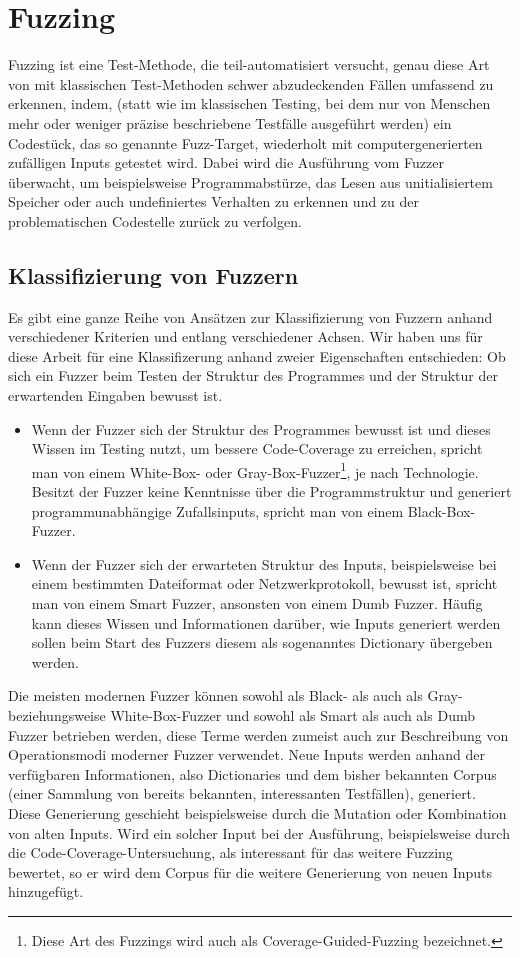 \documentclass[a4paper]{article}
\begin{document}
\section{Fuzzing}
Fuzzing ist eine Test-Methode, die teil-automatisiert versucht, genau diese Art von mit klassischen Test-Methoden schwer abzudeckenden Fällen umfassend zu erkennen, indem, (statt wie im klassischen Testing, bei dem nur von Menschen mehr oder weniger präzise beschriebene Testfälle ausgeführt werden) ein Codestück, das so genannte Fuzz-Target, wiederholt mit computergenerierten zufälligen Inputs getestet wird. 
Dabei wird die Ausführung vom Fuzzer überwacht, um beispielsweise Programmabstürze, das Lesen aus unitialisiertem Speicher oder auch undefiniertes Verhalten zu erkennen und zu der problematischen Codestelle zurück zu verfolgen.

\subsection{Klassifizierung von Fuzzern}
Es gibt eine ganze Reihe von Ansätzen zur Klassifizierung von Fuzzern anhand verschiedener Kriterien und entlang verschiedener Achsen. Wir haben uns für diese Arbeit für eine Klassifizerung anhand zweier Eigenschaften entschieden: Ob sich ein Fuzzer beim Testen der Struktur des Programmes und der Struktur der erwartenden Eingaben bewusst ist.
\begin{itemize}
    \item Wenn der Fuzzer sich der Struktur des Programmes bewusst ist und dieses Wissen im Testing nutzt, um bessere Code-Coverage zu erreichen, spricht man von einem White-Box- oder Gray-Box-Fuzzer\footnote{Diese Art des Fuzzings wird auch als Coverage-Guided-Fuzzing bezeichnet.}, je nach Technologie.
        Besitzt der Fuzzer keine Kenntnisse über die Programmstruktur und generiert programmunabhängige Zufallsinputs, spricht man von einem Black-Box-Fuzzer.
    \item Wenn der Fuzzer sich der erwarteten Struktur des Inputs, beispielsweise bei einem bestimmten Dateiformat oder Netzwerkprotokoll, bewusst ist, spricht man von einem Smart Fuzzer, ansonsten von einem Dumb Fuzzer. Häufig kann dieses Wissen und Informationen darüber, wie Inputs generiert werden sollen beim Start des Fuzzers diesem als sogenanntes Dictionary übergeben werden.
\end{itemize}
Die meisten modernen Fuzzer können sowohl als Black- als auch als Gray- beziehungsweise White-Box-Fuzzer und sowohl als Smart als auch als Dumb Fuzzer betrieben werden, diese Terme werden zumeist auch zur Beschreibung von Operationsmodi moderner Fuzzer verwendet. 
Neue Inputs werden anhand der verfügbaren Informationen, also Dictionaries und dem bisher bekannten Corpus (einer Sammlung von bereits bekannten, interessanten Testfällen), generiert. 
Diese Generierung geschieht beispielsweise durch die Mutation oder Kombination von alten Inputs.
Wird ein solcher Input bei der Ausführung, beispielsweise durch die Code-Coverage-Untersuchung, als interessant für das weitere Fuzzing bewertet, so er wird dem Corpus für die weitere Generierung von neuen Inputs hinzugefügt.
\end{document}
